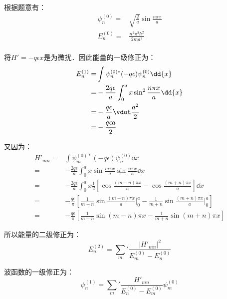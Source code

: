 \subsection{ }
根据题意有：
\begin{equation}
\begin{aligned}
\psi^{(0)}_{n} =& \sqrt{\frac{2}{a}} \sin{\frac{n \pi x}{a}} \\
E^{(0)}_{n} =& \frac{n^{2} \pi^{2} \hbar^{2}}{2ma^{2}} \\
\end{aligned}
\end{equation}

将$H' = -q \epsilon x$是为微扰．因此能量的一级修正为：
\begin{equation}
\begin{aligned}
E^{(1)}_{n} =& \int \psi_{n}^{(0)*} (-q\epsilon) \psi_{n}^{(0)} \dd{x} \\
=& -\frac{2q\epsilon}{a} \int^{a}_{0} x \sin^{2}{\frac{n \pi x}{a}} \dd{x} \\
=& -\frac{q\epsilon}{a} \vdot \frac{a^{2}}{2} \\
=& -\frac{q \epsilon a}{2}
\end{aligned}
\end{equation}

又因为：
\begin{equation}
\begin{aligned}
H'_{mn} =& \int \psi_{m}^{(0)*} (-q\epsilon) \psi_{n}^{(0)} \dd{x} \\
=& -\frac{2q\epsilon}{a} \int^{a}_{0} x \sin{\frac{m \pi x}{a}} \sin{\frac{n \pi x}{a}} \dd{x} \\
=& -\frac{2q\epsilon}{a} \int^{a}_{0} x \frac{1}{2} \left[\cos{\frac{(m-n)\pi x}{a}} - \cos{\frac{(m+n)\pi x}{a}} \right] \dd{x} \\
=& -\frac{q\epsilon}{\pi} \left[\frac{1}{m-n}\sin{\frac{(m-n)\pi x}{a}} \Big|^{a}_{0} - \frac{1}{m+n}\sin{\frac{(m+n)\pi x}{a}} \Big|^{a}_{0} \right] \\
=& -\frac{q\epsilon}{\pi} \left[\frac{1}{m-n}\sin{(m-n)\pi x} - \frac{1}{m+n}\sin{(m+n)\pi x}  \right]
\end{aligned}
\end{equation}

所以能量的二级修正为：
\begin{equation}
E^{(2)}_{n} = \sum_{m}' \frac{\left|H'_{mn} \right|^{2}}{E^{(0)}_{m} - E^{(0)}_{n}}
\end{equation}

波函数的一级修正为：
\begin{equation}
\psi^{(1)}_{n} = \sum_{m}'\frac{H'_{mn}}{E^{(0)}_{n} - E^{(0)}_{m}} \psi^{(0)}_{m}
\end{equation}

